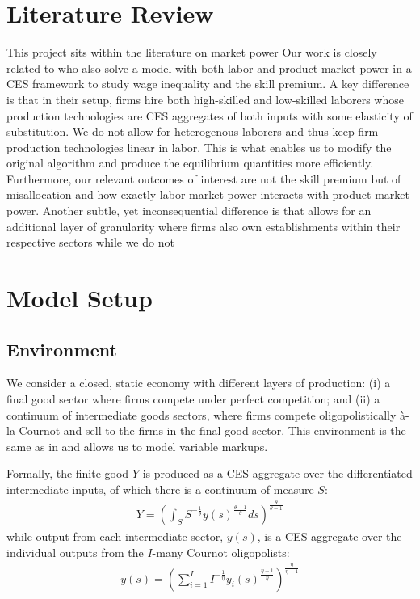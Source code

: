 \documentclass[12pt]{article}%
\begin{document}
\section{Literature Review}
This project sits within the literature on market power 
Our work is closely related to \citet{Deb-et-al_2024} who also solve a model with both labor and product market power in a CES framework to study wage inequality and the skill premium. A key difference is that in their setup, firms hire both high-skilled and low-skilled laborers whose production technologies are CES aggregates of both inputs with some elasticity of substitution. We do not allow for heterogenous laborers and thus keep firm production technologies linear in labor. This is what enables us to modify the original algorithm and produce the equilibrium quantities more efficiently. Furthermore, our relevant outcomes of interest are not the skill premium but of misallocation and how exactly labor market power interacts with product market power. Another subtle, yet inconsequential difference is that \citet{Deb-et-al_2024} allows for an additional layer of granularity where firms also own establishments within their respective sectors while we do not 

\section{Model Setup}

\subsection{Environment}
We consider a closed, static economy with different layers of production: (i) a final good sector where firms compete under perfect competition; and (ii) a continuum of intermediate goods sectors, where firms compete oligopolistically à-la Cournot and sell to the firms in the final good sector. This environment is the same as in \citet{Atkeson-Burstein_2008} and allows us to model variable markups.

Formally, the finite good $Y$ is produced as a CES aggregate over the differentiated intermediate inputs, of which there is a continuum of measure $S$:
\begin{align*}
    Y = \left( \int_{S} S^{- \frac{1}{\theta}} y(s)^{\frac{\theta - 1}{\theta}} ds \right) ^{\frac{\theta}{\theta - 1}}
\end{align*}
while output from each intermediate sector, $y(s)$, is a CES aggregate over the individual outputs from the $I$-many Cournot oligopolists:
\begin{align*}
    y(s) = \left( \sum_{i=1} ^I I^{- \frac{1}{\eta}} y_i(s)^{\frac{\eta - 1}{\eta}} \right) ^{\frac{\eta}{\eta - 1}}
\end{align*}
\end{document}

